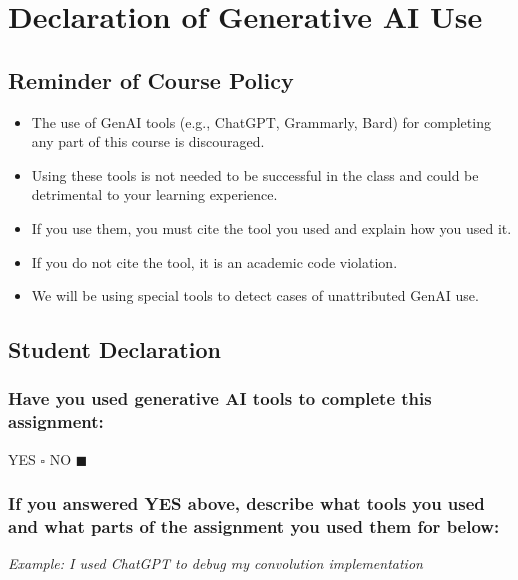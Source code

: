 \newpage

\section*{Declaration of Generative AI Use}

\subsection*{Reminder of Course Policy}

\begin{itemize}
    \item The use of GenAI tools (e.g., ChatGPT, Grammarly, Bard) for completing any part of this course is discouraged.
    \item Using these tools is not needed to be successful in the class and could be detrimental to your learning experience.
    \item If you use them, you must cite the tool you used and explain how you used it.
    \item If you do not cite the tool, it is an academic code violation.
    \item We will be using special tools to detect cases of unattributed GenAI use.
\end{itemize}

\subsection*{Student Declaration}

\subsubsection*{Have you used generative AI tools to complete this assignment:}


YES $\square$ NO $\blacksquare$ %


\subsubsection*{If you answered YES above, describe what tools you used and what parts of the assignment you used them for below:}


\textit{Example: I used ChatGPT to debug my convolution implementation}

